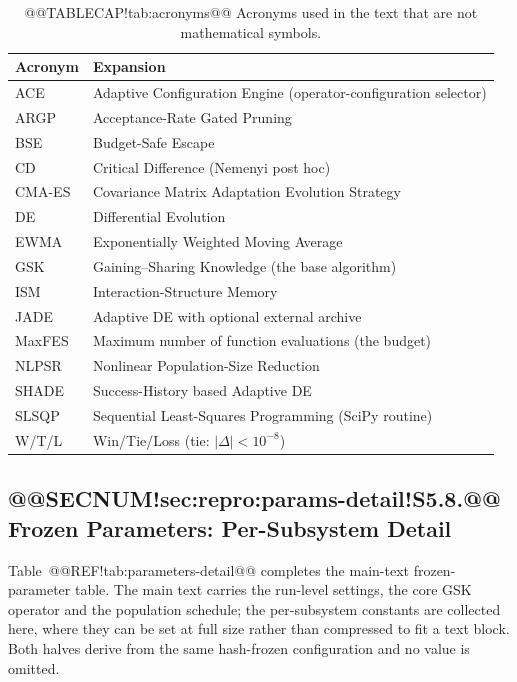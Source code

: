 \documentclass[10pt,a4paper]{article}
\begin{document}
\begin{table}[H]
\caption{@@TABLECAP!tab:acronyms@@ Acronyms used in the text that are not mathematical symbols.}
\label{tab:acronyms}
\small
\begin{tabular}{ll}
\toprule
\textbf{Acronym} & \textbf{Expansion}\\
\midrule
ACE & Adaptive Configuration Engine (operator-configuration selector)\\
ARGP & Acceptance-Rate Gated Pruning\\
BSE & Budget-Safe Escape\\
CD & Critical Difference (Nemenyi post hoc)\\
CMA-ES & Covariance Matrix Adaptation Evolution Strategy\\
DE & Differential Evolution\\
EWMA & Exponentially Weighted Moving Average\\
GSK & Gaining--Sharing Knowledge (the base algorithm)\\
ISM & Interaction-Structure Memory\\
JADE & Adaptive DE with optional external archive\\
MaxFES & Maximum number of function evaluations (the budget)\\
NLPSR & Nonlinear Population-Size Reduction\\
SHADE & Success-History based Adaptive DE\\
SLSQP & Sequential Least-Squares Programming (SciPy routine)\\
W/T/L & Win/Tie/Loss (tie: $|\Delta| < 10^{-8}$)\\
\bottomrule
\end{tabular}
\end{table}

\subsection{@@SECNUM!sec:repro:params-detail!S5.8.@@ Frozen Parameters: Per-Subsystem Detail}\label{sec:repro:params-detail}

Table~@@REF!tab:parameters-detail@@ completes the main-text
frozen-parameter table. The main text carries the run-level settings, the
core GSK operator and the population schedule; the per-subsystem constants are
collected here, where they can be set at full size rather than compressed to fit
a text block. Both halves derive from the same hash-frozen configuration and no
value is omitted.
\end{document}
